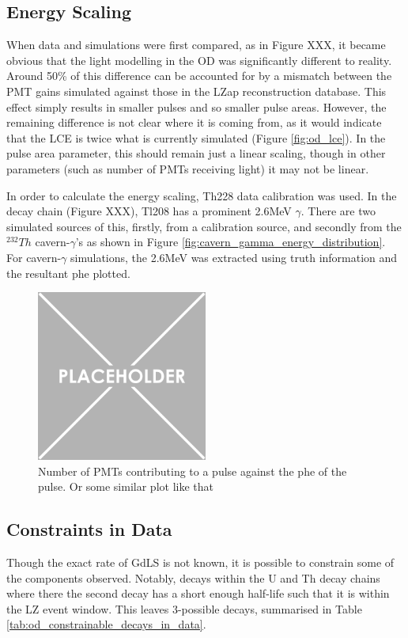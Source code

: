 \subsection{Energy Scaling}
\par
When data and simulations were first compared, as in Figure XXX, it became obvious that the light modelling in the OD was significantly different to reality.
Around 50\% of this difference can be accounted for by a mismatch between the PMT gains simulated against those in the LZap reconstruction database.
This effect simply results in smaller pulses and so smaller pulse areas.
However, the remaining difference is not clear where it is coming from, as it would indicate that the LCE is twice what is currently simulated (Figure \ref{fig:od_lce}).
In the pulse area parameter, this should remain just a linear scaling, though in other parameters (such as number of PMTs receiving light) it may not be linear.

\par
In order to calculate the energy scaling, Th228 data calibration was used. 
In the decay chain (Figure XXX), Tl208 has a prominent 2.6MeV $\gamma$. 
There are two simulated sources of this, firstly, from a calibration source, and secondly from the ${}^{232}Th$ cavern-$\gamma$'s as shown in Figure \ref{fig:cavern_gamma_energy_distribution}.
For cavern-$\gamma$ simulations, the 2.6MeV was extracted using truth information and the resultant phe plotted.


\begin{figure}
    \centering
    \includegraphics[width=0.5\textwidth]{Figures/Placeholder.png}
    \caption{Number of PMTs contributing to a pulse against the phe of the pulse. Or some similar plot like that}
    \label{fig:OD_coincidence_difference}
\end{figure}


\subsection{Constraints in Data}
\par
Though the exact rate of GdLS is not known, it is possible to constrain some of the components observed.
Notably, decays within the U and Th decay chains where there the second decay has a short enough half-life such that it is within the LZ event window.
This leaves 3-possible decays, summarised in Table \ref{tab:od_constrainable_decays_in_data}.

